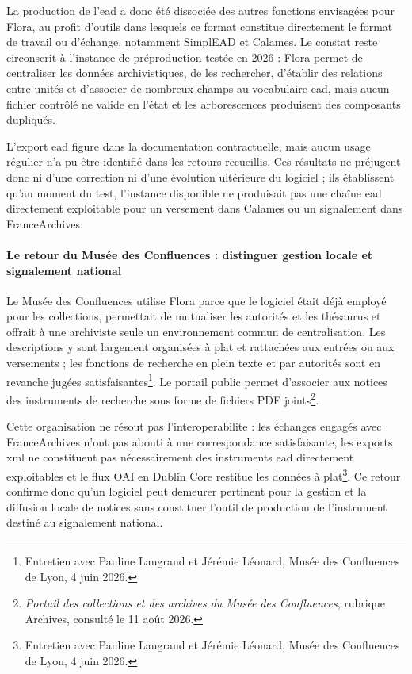 La production de l'\gls{ead} a donc été dissociée des autres fonctions envisagées pour Flora, au profit d'outils dans lesquels ce format constitue directement le format de travail ou d'échange, notamment SimplEAD et Calames. Le constat reste circonscrit à l'instance de préproduction testée en 2026 : Flora permet de centraliser les données archivistiques, de les rechercher, d'établir des relations entre unités et d'associer de nombreux champs au vocabulaire \gls{ead}, mais aucun fichier contrôlé ne valide en l'état et les arborescences produisent des composants dupliqués.

L'export \gls{ead} figure dans la documentation contractuelle, mais aucun usage régulier n'a pu être identifié dans les retours recueillis. Ces résultats ne préjugent donc ni d'une correction ni d'une évolution ultérieure du logiciel ; ils établissent qu'au moment du test, l'instance disponible ne produisait pas une chaîne \gls{ead} directement exploitable pour un versement dans Calames ou un \gls{signalement} dans FranceArchives.

\paragraph{Le retour du Musée des Confluences : distinguer gestion locale et signalement national}

Le Musée des Confluences utilise Flora parce que le logiciel était déjà employé pour les collections, permettait de mutualiser les autorités et les thésaurus et offrait à une archiviste seule un environnement commun de centralisation. Les descriptions y sont largement organisées à plat et rattachées aux entrées ou aux versements ; les fonctions de recherche en plein texte et par autorités sont en revanche jugées satisfaisantes\footnote{Entretien avec Pauline Laugraud et Jérémie Léonard, Musée des Confluences de Lyon, 4 juin 2026.}. Le portail public permet d'associer aux notices des instruments de recherche sous forme de fichiers PDF joints\footnote{\emph{Portail des collections et des archives du Musée des Confluences}, rubrique Archives, consulté le 11 août 2026.}.

Cette organisation ne résout pas l'\gls{interoperabilite} : les échanges engagés avec FranceArchives n'ont pas abouti à une correspondance satisfaisante, les exports \gls{xml} ne constituent pas nécessairement des instruments \gls{ead} directement exploitables et le flux OAI en Dublin Core restitue les données à plat\footnote{Entretien avec Pauline Laugraud et Jérémie Léonard, Musée des Confluences de Lyon, 4 juin 2026.}. Ce retour confirme donc qu'un logiciel peut demeurer pertinent pour la gestion et la diffusion locale de notices sans constituer l'outil de production de l'instrument destiné au \gls{signalement} national.


